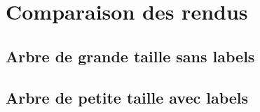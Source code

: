 \section{Comparaison des rendus}

\subsection{Arbre de grande taille sans labels}

\subsection{Arbre de petite taille avec labels}